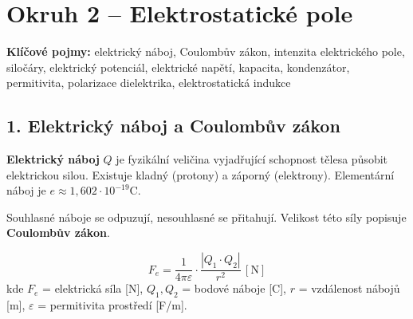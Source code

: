 \documentclass[a4paper,10pt]{article}
\newcommand{\jednotka}[1]{\,[\mathrm{#1}]}
\begin{document}
\section*{\large Okruh 2 – Elektrostatické pole}

\begin{pojmybox}
\textbf{Klíčové pojmy:}
elektrický náboj, Coulombův zákon, intenzita elektrického pole, siločáry, elektrický potenciál, elektrické napětí, kapacita, kondenzátor, permitivita, polarizace dielektrika, elektrostatická indukce
\end{pojmybox}

\begin{vysvetlenibox}

\subsection*{1. Elektrický náboj a Coulombův zákon}

\textbf{Elektrický náboj} $Q$ je fyzikální veličina vyjadřující schopnost tělesa působit elektrickou silou. Existuje kladný (protony) a záporný (elektrony). Elementární náboj je $e \approx 1{,}602 \cdot 10^{-19}\mathrm{C}$. 

Souhlasné náboje se odpuzují, nesouhlasné se přitahují. Velikost této síly popisuje \textbf{Coulombův zákon}.

\begin{vzorcebox}
\[
F_e = \frac{1}{4\pi\varepsilon} \cdot \frac{|Q_1 \cdot Q_2|}{r^2} \jednotka{N}
\]
kde $F_e$ = elektrická síla [N], $Q_1, Q_2$ = bodové náboje [C], $r$ = vzdálenost nábojů [m], $\varepsilon$ = permitivita prostředí [F/m].
\end{vzorcebox}

\begin{center}
\end{center}
\end{vysvetlenibox}
\end{document}
